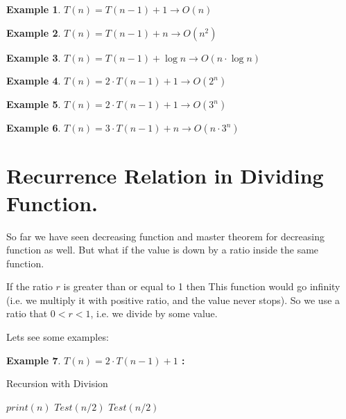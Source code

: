 \documentclass[]{article}
\theoremstyle{plain}
\theoremstyle{definition}
\newtheorem{lem}{Example}[thm]
\begin{document}
\begin{lem}
$T(n) = T(n - 1) + 1 \rightarrow O(n)$
\end{lem}

\begin{lem}
    $T(n) = T(n - 1) + n \rightarrow O(n^2)$
\end{lem}

\begin{lem}
    $T(n) = T(n - 1) + \log{n} \rightarrow O(n\cdot \log{n})$
\end{lem}

\begin{lem}
    $T(n) = 2\cdot T(n - 1) + 1 \rightarrow O(2^n)$
\end{lem}

\begin{lem}
    $T(n) = 2\cdot T(n - 1) + 1 \rightarrow O(3^n)$
\end{lem}
\begin{lem}
    $T(n) = 3\cdot T(n - 1) + n \rightarrow O(n\cdot 3^n)$
\end{lem}

\section{Recurrence Relation in Dividing Function.}
So far we have seen decreasing function and master theorem for decreasing function as well. But what if the value is down by a ratio inside the same function. 

If the ratio $r$ is greater than or equal to 1 then This function would go infinity (i.e. we multiply it with positive ratio, and the value never stops). So we use a ratio that $0 < r < 1$, i.e. we divide by some value.

Lets see some examples:
\begin{lem}
\textbf{$T(n) = 2 \cdot T(n -1) + 1$ :}
\begin{algorithm}[H]
    \caption{Recursion with Division}
    \label{SimpleDivisionRecursion}
    \begin{algorithmic}
         
            \State$print(n)$ 
            \EndFor
            \State$Test(n/2)$  
            \State$Test(n/2)$  
        \EndIf 
        \EndProcedure
    \end{algorithmic}
\end{algorithm}
\end{lem}
\end{document}
